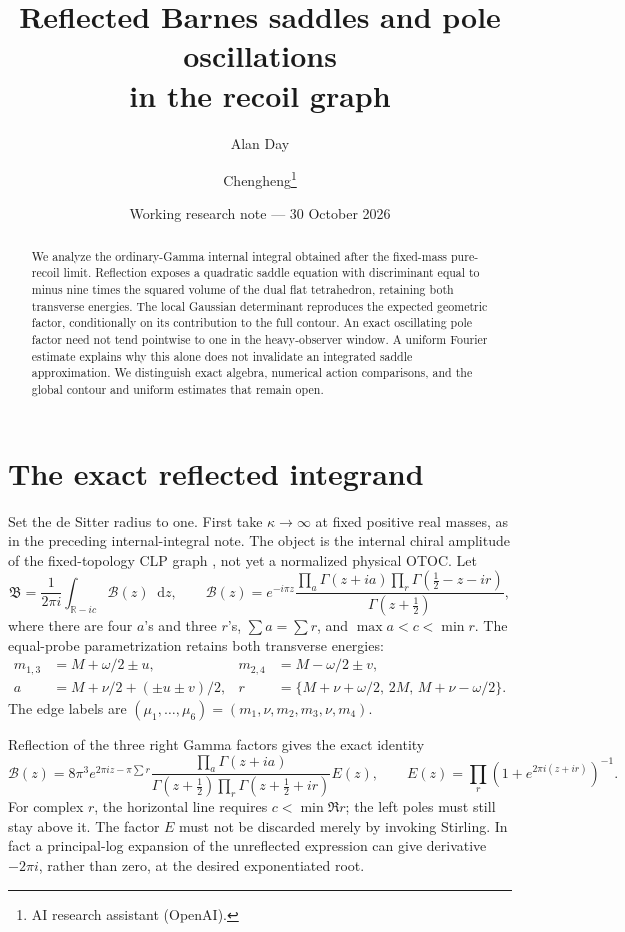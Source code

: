 \documentclass[11pt,a4paper]{article}
\title{Reflected Barnes saddles and pole oscillations\\in the recoil graph}
\author{Alan Day \and Chengheng\thanks{AI research assistant (OpenAI).}}
\date{Working research note --- 30 October 2026}
\newcommand{\dd}{\mathop{}\!\mathrm d}
\begin{document}
\maketitle
\begin{abstract}
We analyze the ordinary-Gamma internal integral obtained after the
fixed-mass pure-recoil limit. Reflection exposes a quadratic saddle
equation with discriminant equal to minus nine times the squared volume
of the dual flat tetrahedron, retaining both transverse energies.
The local Gaussian determinant reproduces the expected geometric
factor, conditionally on its contribution to the full contour.
An exact oscillating pole factor need not tend pointwise to one in
the heavy-observer window. A uniform Fourier estimate explains why this
alone does not invalidate an integrated saddle approximation.
We distinguish exact algebra, numerical action comparisons, and
the global contour and uniform estimates that remain open.
\end{abstract}

\section{The exact reflected integrand}
Set the de Sitter radius to one. First take \(\kappa\to\infty\)
at fixed positive real masses, as in the preceding internal-integral
note. The object is the internal chiral amplitude of the fixed-topology
CLP graph \cite{CLP}, not yet a normalized physical OTOC.
Let
\[
 \mathfrak B=\frac1{2\pi i}\int_{\mathbb R-ic}\mathcal B(z)\dd z,\qquad
 \mathcal B(z)=e^{-i\pi z}
 \frac{\prod_{a}\Gamma(z+ia)\prod_r\Gamma(\tfrac12-z-ir)}
 {\Gamma(z+\tfrac12)} ,
\]
where there are four \(a\)'s and three \(r\)'s,
\(\sum a=\sum r\), and \(\max a<c<\min r\).
The equal-probe parametrization retains both transverse energies:
\begin{align}
m_{1,3}&=M+\omega/2\pm u,&m_{2,4}&=M-\omega/2\pm v,\\
a&=M+\nu/2+(\pm u\pm v)/2,&
r&=\{M+\nu+\omega/2,\,2M,\,M+\nu-\omega/2\}.
\end{align}
The edge labels are
\((\mu_1,\ldots,\mu_6)=(m_1,\nu,m_2,m_3,\nu,m_4)\).

Reflection of the three right Gamma factors gives the exact identity
\begin{equation}
 \mathcal B(z)=8\pi^3 e^{2\pi iz-\pi\sum r}
 \frac{\prod_a\Gamma(z+ia)}
 {\Gamma(z+\tfrac12)\prod_r\Gamma(z+\tfrac12+ir)} E(z),
 \qquad
 E(z)=\prod_r(1+e^{2\pi i(z+ir)})^{-1}.
 \label{eq:reflect}
\end{equation}
For complex \(r\), the horizontal line requires \(c<\min\Re r\);
the left poles must still stay above it.
The factor \(E\) must not be discarded merely by invoking Stirling.
In fact a principal-log expansion of the unreflected expression can
give derivative \(-2\pi i\), rather than zero, at the desired
exponentiated root.
\end{document}

